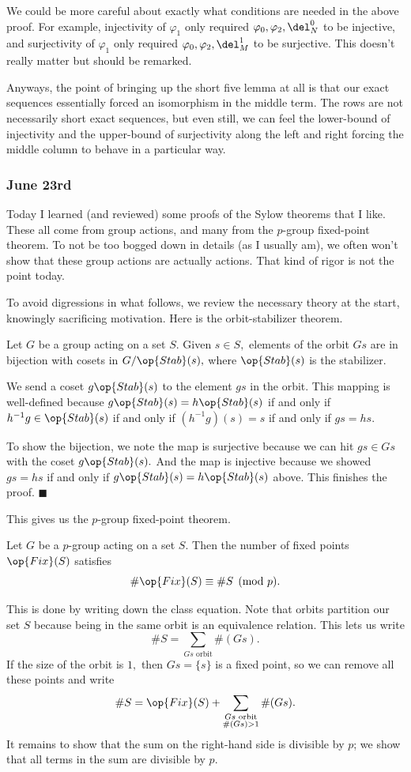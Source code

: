 We could be more careful about exactly what conditions are needed in the above proof. For example, injectivity of $\varphi_1$ only required $\varphi_0,\varphi_2,\del_N^0$ to be injective, and surjectivity of $\varphi_1$ only required $\varphi_0,\varphi_2,\del_M^1$ to be surjective. This doesn't really matter but should be remarked.

Anyways, the point of bringing up the short five lemma at all is that our exact sequences essentially forced an isomorphism in the middle term. The rows are not necessarily short exact sequences, but even still, we can feel the lower-bound of injectivity and the upper-bound of surjectivity along the left and right forcing the middle column to behave in a particular way.

\subsubsection{June 23rd}
Today I learned (and reviewed) some proofs of the Sylow theorems that I like. These all come from group actions, and many from the $p$-group fixed-point theorem. To not be too bogged down in details (as I usually am), we often won't show that these group actions are actually actions. That kind of rigor is not the point today.

To avoid digressions in what follows, we review the necessary theory at the start, knowingly sacrificing motivation. Here is the orbit-stabilizer theorem.
\begin{proposition}
    Let $G$ be a group acting on a set $S.$ Given $s\in S,$ elements of the orbit $Gs$ are in bijection with cosets in $G/\op{Stab}(s),$ where $\op{Stab}(s)$ is the stabilizer.
\end{proposition}
We send a coset $g\op{Stab}(s)$ to the element $gs$ in the orbit. This mapping is well-defined because $g\op{Stab}(s)=h\op{Stab}(s)$ if and only if $h^{-1}g\in\op{Stab}(s)$ if and only if $\left(h^{-1}g\right)(s)=s$ if and only if $gs=hs.$

To show the bijection, we note the map is surjective because we can hit $gs\in Gs$ with the coset $g\op{Stab}(s).$ And the map is injective because we showed $gs=hs$ if and only if $g\op{Stab}(s)=h\op{Stab}(s)$ above. This finishes the proof. $\blacksquare$

This gives us the $p$-group fixed-point theorem.
\begin{theorem}
    Let $G$ be a $p$-group acting on a set $S.$ Then the number of fixed points $\op{Fix}(S)$ satisfies
    \[\#\op{Fix}(S)\equiv\#S\pmod p.\]
\end{theorem}
This is done by writing down the class equation. Note that orbits partition our set $S$ because being in the same orbit is an equivalence relation. This lets us write
\[\#S=\sum_{Gs\text{ orbit}}\#(Gs).\]
If the size of the orbit is $1,$ then $Gs=\{s\}$ is a fixed point, so we can remove all these points and write
\[\#S=\op{Fix}(S)+\sum_{\substack{Gs\text{ orbit}\\\#(Gs)>1}}\#(Gs).\]
It remains to show that the sum on the right-hand side is divisible by $p$; we show that all terms in the sum are divisible by $p.$

